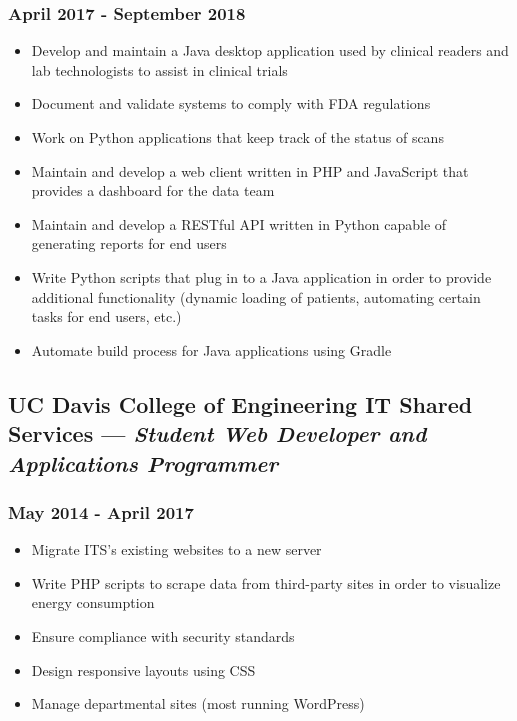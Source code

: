 \documentclass{article}
\begin{document}
\begin{minipage}[t]{.8\textwidth}
\subsubsection*{April 2017 - September 2018}
\parbox[t]{.5\textwidth}{\raggedright%
\begin{itemize}
\vspace{-1.5em}
    \item Develop and maintain a Java desktop application used by clinical readers and lab technologists to assist in clinical trials
    \item Document and validate systems to comply with FDA regulations
    \item Work on Python applications that keep track of the status of scans
    \item Maintain and develop a web client written in PHP and JavaScript that provides a dashboard for the data team
\end{itemize}}
\parbox[t]{.5\textwidth}{\raggedright%
\vspace{-1.5em}
\begin{itemize}
    \item Maintain and develop a RESTful API written in Python capable of generating reports for end users
    \item Write Python scripts that plug in to a Java application in order to provide additional functionality (dynamic loading of patients, automating certain tasks for end users, etc.)
    \item Automate build process for Java applications using Gradle
\end{itemize}}
\vspace{-1.5em}
\subsection*{UC Davis College of Engineering IT Shared Services --- \textit{Student Web Developer and Applications Programmer}}
\subsubsection*{May 2014 - April 2017}
\parbox[t]{.5\textwidth}{\raggedright%
\begin{itemize}
\vspace{-1.5em}
    \item Migrate ITS's existing websites to a new server
    \item Write PHP scripts to scrape data from third-party sites in order to visualize energy consumption
\end{itemize}}
\parbox[t]{.5\textwidth}{\raggedright%
\vspace{-1.5em}
\begin{itemize}
    \item Ensure compliance with security standards
    \item Design responsive layouts using CSS
    \item Manage departmental sites (most running WordPress)
\end{itemize}}

\end{minipage}
\end{document}
